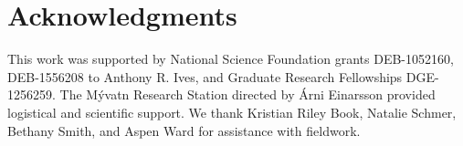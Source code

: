\documentclass[12pt]{article}
\begin{document}





















\section*{Acknowledgments}

This work was supported by National Science Foundation grants 
DEB-1052160, DEB-1556208 to Anthony R. Ives,
and Graduate Research Fellowships DGE-1256259.
The M\'{y}vatn Research Station directed by \'{A}rni Einarsson
provided logistical and scientific support.
We thank Kristian Riley Book, Natalie Schmer, Bethany Smith, and Aspen Ward
for assistance with fieldwork.
\end{document}
